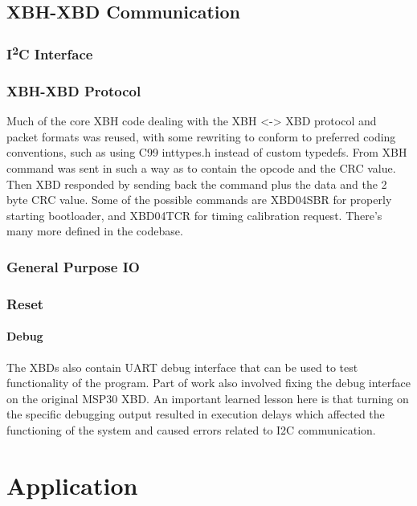 \documentclass[twoside,11pt]{cergdoc}
\newcommand{\ITwoC}{I\textsuperscript{2}C }
\begin{document}
  \section{XBH-XBD Communication}
    \subsection{\ITwoC Interface}
    \subsection{XBH-XBD Protocol}
Much of the core XBH code dealing
with the XBH <-> XBD protocol and packet
formats was reused, with some rewriting to
conform to preferred coding conventions,
such as using C99 inttypes.h instead of
custom typedefs. From XBH command was
sent in such a way as to contain the opcode
and the CRC value. Then XBD responded
by sending back the command plus the data
and the 2 byte CRC value. Some of the
possible commands are XBD04SBR for
properly starting bootloader, and
XBD04TCR for timing calibration request.
There’s many more defined in the codebase.



    \subsection{General Purpose IO}
    \subsection{Reset}
    \subsubsection{Debug}
The XBDs also contain UART debug interface that can be used
to test functionality of the program. Part of work also involved
fixing the debug interface on the original MSP30 XBD. An
important learned lesson here is that turning on the specific
debugging output resulted in execution delays which affected
the functioning of the system and caused errors related to I2C
communication.


\chapter{Application}
\end{document}

